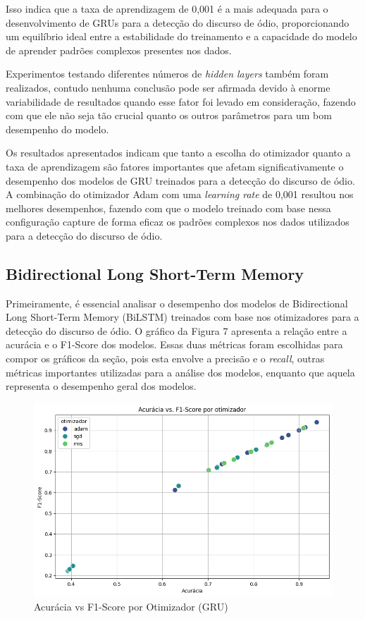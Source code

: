 \documentclass[conference]{IEEEtran}
\begin{document}
Isso indica que a taxa de aprendizagem de 0,001 é a mais adequada para o desenvolvimento de GRUs para a detecção do discurso de ódio, proporcionando um equilíbrio ideal entre a estabilidade do treinamento e a capacidade do modelo de aprender padrões complexos presentes nos dados.

Experimentos testando diferentes números de \textit{hidden layers} também foram realizados, contudo nenhuma conclusão pode ser afirmada devido à enorme variabilidade de resultados quando esse fator foi levado em consideração, fazendo com que ele não seja tão crucial quanto os outros parâmetros para um bom desempenho do modelo.

Os resultados apresentados indicam que tanto a escolha do otimizador quanto a taxa de aprendizagem são fatores importantes que afetam significativamente o desempenho dos modelos de GRU treinados para a detecção do discurso de ódio. A combinação do otimizador Adam com uma \textit{learning rate} de 0,001 resultou nos melhores desempenhos, fazendo com que o modelo treinado com base nessa configuração capture de forma eficaz os padrões complexos nos dados utilizados para a detecção do discurso de ódio.

\subsection{Bidirectional Long Short-Term Memory}

Primeiramente, é essencial analisar o desempenho dos modelos de Bidirectional Long Short-Term Memory (BiLSTM) treinados com base nos otimizadores para a detecção do discurso de ódio. O gráfico da Figura 7 apresenta a relação entre a acurácia e o F1-Score dos modelos. Essas duas métricas foram escolhidas para compor os gráficos da seção, pois esta envolve a precisão e o \textit{recall}, outras métricas importantes utilizadas para a análise dos modelos, enquanto que aquela representa o desempenho geral dos modelos.

\begin{figure}[h!]
    \centering
    \includegraphics[width=\linewidth]{images/bilstm-otimizador.png}
    \caption{Acurácia vs F1-Score por Otimizador (GRU)}
    \label{fig:exemplo4}
\end{figure}
\end{document}
